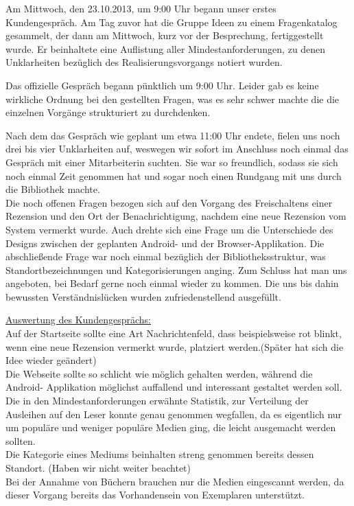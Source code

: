 \documentclass[fontsize=12pt,paper=a4,twoside]{scrartcl}
\begin{document}
Am Mittwoch, den 23.10.2013, um 9:00 Uhr begann unser erstes Kundengespräch.
Am Tag zuvor hat die Gruppe Ideen zu einem Fragenkatalog gesammelt, der dann
am Mittwoch, kurz vor der Besprechung, fertiggestellt wurde. Er beinhaltete
eine Auflistung aller Mindestanforderungen, zu denen Unklarheiten bezüglich 
des Realisierungsvorgangs notiert wurden. 

Das offizielle Gespräch begann pünktlich um 9:00 Uhr. Leider gab es keine 
wirkliche Ordnung bei den gestellten Fragen, was es sehr schwer machte die 
die einzelnen Vorgänge strukturiert zu durchdenken.

Nach dem das Gespräch wie geplant um etwa 11:00 Uhr endete, fielen uns noch 
drei bis vier Unklarheiten auf, weswegen wir sofort im Anschluss noch einmal das Gespräch mit einer Mitarbeiterin suchten. Sie war so freundlich, sodass sie sich noch einmal Zeit genommen hat und sogar noch einen Rundgang mit uns durch die Bibliothek machte. \\

Die noch offenen Fragen bezogen sich auf den Vorgang des Freischaltens einer Rezension
und den Ort der Benachrichtigung, nachdem eine neue Rezension vom System vermerkt
wurde. Auch drehte sich eine Frage um die Unterschiede des Designs zwischen
der geplanten Android- und der Browser-Applikation. Die abschließende Frage war noch einmal bezüglich der Bibliotheksstruktur, was Standortbezeichnungen und
Kategorisierungen anging. Zum Schluss hat man uns angeboten, bei Bedarf gerne 
noch einmal wieder zu kommen. Die uns bis dahin bewussten Verständnislücken
wurden zufriedenstellend ausgefüllt. 

\underline{Auswertung des Kundengesprächs:}\\

Auf der Startseite sollte eine Art Nachrichtenfeld, dass beispielsweise rot blinkt,
wenn eine neue Rezension vermerkt wurde, platziert werden.(Später hat sich die Idee wieder geändert)
\\
Die Webseite sollte so schlicht wie möglich gehalten werden, während die Android-
Applikation möglichst auffallend und interessant gestaltet werden soll.
\\
Die in den Mindestanforderungen erwähnte Statistik, zur Verteilung der Ausleihen auf den
Leser konnte genau genommen wegfallen, da es eigentlich nur um populäre und weniger
populäre Medien ging, die leicht ausgemacht werden sollten.
\\
Die Kategorie eines Mediums beinhalten streng genommen bereits dessen Standort.
(Haben wir nicht weiter beachtet)
\\
Bei der Annahme von Büchern brauchen nur die Medien eingescannt werden, da dieser Vorgang
bereits das Vorhandensein von Exemplaren unterstützt.
\end{document}
